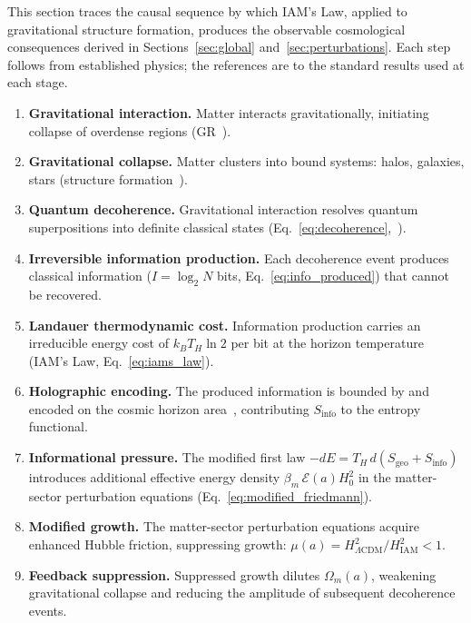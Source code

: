 \documentclass[12pt,a4paper]{article}
\begin{document}
This section traces the causal sequence by which IAM's Law, applied
to gravitational structure formation, produces the observable
cosmological consequences derived in Sections~\ref{sec:global}
and~\ref{sec:perturbations}. Each step follows from established
physics; the references are to the standard results used at each
stage.

\begin{enumerate}
\item \textbf{Gravitational interaction.} Matter interacts
  gravitationally, initiating collapse of overdense regions
  (GR~\citep{Einstein1915}).

\item \textbf{Gravitational collapse.} Matter clusters into bound
  systems: halos, galaxies, stars
  (structure formation~\citep{Peebles1980}).

\item \textbf{Quantum decoherence.} Gravitational interaction
  resolves quantum superpositions into definite classical states
  (Eq.~\eqref{eq:decoherence},~\citep{Zurek2003}).

\item \textbf{Irreversible information production.} Each
  decoherence event produces classical information ($I =
  \log_2 N$ bits, Eq.~\eqref{eq:info_produced}) that cannot be
  recovered.

\item \textbf{Landauer thermodynamic cost.} Information production
  carries an irreducible energy cost of $k_B T_H \ln 2$ per bit
  at the horizon temperature (IAM's Law, Eq.~\eqref{eq:iams_law}).

\item \textbf{Holographic encoding.} The produced information is
  bounded by and encoded on the cosmic horizon
  area~\citep{Bekenstein1973,tHooft1993,Susskind1995},
  contributing $S_\mathrm{info}$ to the entropy functional.

\item \textbf{Informational pressure.} The modified first law
  $-dE = T_H\,d(S_\mathrm{geo} + S_\mathrm{info})$ introduces
  additional effective energy density $\beta_m\,\mathcal{E}(a)H_0^2$
  in the matter-sector perturbation equations
  (Eq.~\eqref{eq:modified_friedmann}).

\item \textbf{Modified growth.} The matter-sector perturbation
  equations acquire enhanced Hubble friction, suppressing growth:
  $\mu(a) = H^2_{\Lambda\mathrm{CDM}}/H^2_\mathrm{IAM} < 1$.

\item \textbf{Feedback suppression.} Suppressed growth dilutes
  $\Omega_m(a)$, weakening gravitational collapse and reducing
  the amplitude of subsequent decoherence events.
\end{enumerate}
\end{document}

